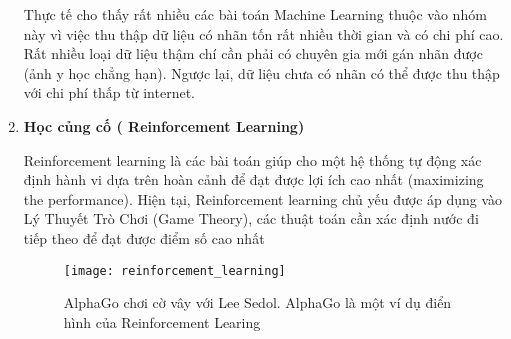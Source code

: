 \begin{enumerate}
Thực tế cho thấy rất nhiều các bài toán Machine Learning thuộc vào nhóm này vì việc thu thập dữ liệu có nhãn tốn rất nhiều thời gian và có chi phí cao. 
Rất nhiều loại dữ liệu thậm chí cần phải có chuyên gia mới gán nhãn được (ảnh y học chẳng hạn). 
Ngược lại, dữ liệu chưa có nhãn có thể được thu thập với chi phí thấp từ internet.
\newline
\newline   
\item \textbf{Học củng cố ( Reinforcement Learning)}
\par
Reinforcement learning là các bài toán giúp cho một hệ thống tự động xác định hành vi dựa trên hoàn cảnh để đạt được lợi ích cao nhất (maximizing the performance). Hiện tại, Reinforcement learning chủ yếu được áp dụng vào Lý Thuyết Trò Chơi (Game Theory), các thuật toán cần xác định nước đi tiếp theo để đạt được điểm số cao nhất
\begin{figure}[!htbp]
    \centering
    \texttt{[image: reinforcement\_learning]}
    \caption{AlphaGo chơi cờ vây với Lee Sedol. AlphaGo là một ví dụ điển hình của Reinforcement Learing}
    \label{fig:x cubed graph}
\end{figure}
\FloatBarrier
\end{enumerate}